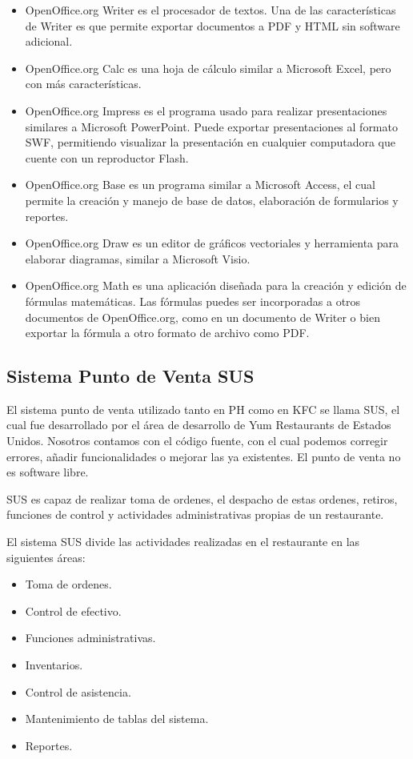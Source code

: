\begin{itemize}
 \item OpenOffice.org Writer es el procesador de textos. Una de las características de Writer es que permite exportar documentos a PDF y HTML sin software adicional.
 \item OpenOffice.org Calc es una hoja de cálculo similar a Microsoft Excel, pero con más características.
 \item OpenOffice.org Impress es el programa usado para realizar presentaciones similares a Microsoft PowerPoint. Puede exportar presentaciones al formato SWF, permitiendo visualizar la presentación en cualquier computadora que cuente con un reproductor Flash.
 \item OpenOffice.org Base es un programa similar a Microsoft Access, el cual permite la creación y manejo de base de datos, elaboración de formularios y reportes.
 \item OpenOffice.org Draw es un editor de gráficos vectoriales y herramienta para elaborar diagramas, similar a Microsoft Visio.
 \item OpenOffice.org Math es una aplicación diseñada para la creación y edición de fórmulas matemáticas. Las fórmulas puedes ser incorporadas a otros documentos de OpenOffice.org, como en un documento de Writer o bien exportar la fórmula a otro formato de archivo como PDF.
\end{itemize}

\subsection{Sistema Punto de Venta SUS}
\label{sec:sus}

El sistema punto de venta utilizado tanto en PH como en KFC se llama SUS, el cual fue desarrollado por el área de desarrollo de Yum Restaurants de Estados Unidos. Nosotros contamos con el código fuente, con el cual podemos corregir errores, añadir funcionalidades o mejorar las ya existentes. El punto de venta no es software libre.

SUS es capaz de realizar toma de ordenes, el despacho de estas ordenes, retiros, funciones de control y actividades administrativas propias de un restaurante.

El sistema SUS divide las actividades realizadas en el restaurante en las siguientes áreas:

\begin{itemize}
 \item Toma de ordenes.
 \item Control de efectivo.
 \item Funciones administrativas.
 \item Inventarios.
 \item Control de asistencia.
 \item Mantenimiento de tablas del sistema.
 \item Reportes.
\end{itemize}

